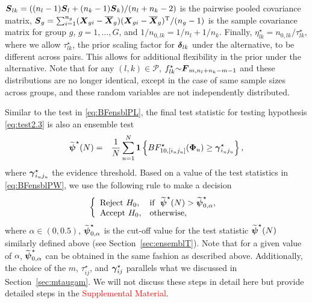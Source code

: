 \documentclass[times,sort&compress,3p]{elsarticle}
\theoremstyle{plain}%
\theoremstyle{definition}
\def\be{\begin{eqnarray}}
\def\ee{\end{eqnarray}}
\def\boldpsi{{\mbox{\boldmath $\psi$}}}
\def\trans{^{\rm T}}
\def\bone{{\mathbf 1}}
\newcommand{\uF}       {\mbox{\boldmath$F$}}
\newcommand{\uS}       {\mbox{\boldmath$S$}}
\newcommand{\uX}       {\mbox{\boldmath$X$}}
\newcommand{\ugamma}            {\mbox{\boldmath$\gamma$}}
\newcommand{\udelta}            {\mbox{\boldmath$\delta$}}
\newcommand{\uPhi}              {\mbox{\boldmath$\Phi$}}
\begin{document}
$\uS_{lk} = ((n_l-1)\uS_{l} + (n_k - 1)\uS_k)/(n_l +n_k -2)$ is the pairwise pooled covariance matrix, $\uS_g = \sum_{i = 1}^{n_g}(\uX_{gi} - \overline{\uX}_g)(\uX_{gi} - \overline{\uX}_g)\trans/(n_g - 1)$ is the sample covariance matrix for group $g$, $g = 1,\ldots,G$, and $1/n_{0,lk} = 1/n_l + 1/n_k$.
Finally, $\eta^{\star}_{lk} = n_{0,lk} /\tau^{\star}_{lk}$, where we allow $\tau^{\star}_{lk}$, the prior scaling factor for $\udelta_{lk}$ under the alternative, to be different across pairs. This allows for additional flexibility in the prior under the alternative.  
Note that for any $ (l,k) \in \mathcal{P}$, $f^{\star}_{lk}{\sim} \uF_{m, n_{l}+n_{k} - m- 1}$ and these distributions are no longer identical, except in the case of same sample sizes across groups, and these random variables are not independently distributed. 

Similar to the test in \eqref{eq:BFensblPL}, the final test statistic for testing hypothesis \eqref{eq:test2.3} is also an ensemble test 
\be
\widetilde{\boldpsi}^{\star}(N) &=& \frac{1}{N}\sum^{N}_{u=1} \bone \left\{ BF^{\star}_{10, [i_u j_u]}(\uPhi_u) \geq \ugamma^{\star}_{i_u j_u} \right\}, \label{eq:BFensblPW}
\ee
where $\ugamma^{\star}_{i_u j_u}$ the evidence threshold. 
Based on a value of the test statistics in \eqref{eq:BFensblPW}, we use the following rule to make a decision
\be
 \left \{
       \begin{array}{llll}
       \mbox{Reject}~ H_{0}, & \mbox{if} ~~ \widetilde{\boldpsi}^{\star}(N) > \widetilde{\boldpsi}^{\star}_{0, \alpha},  \\
       \mbox{Accept}~ H_{0}, & \mbox{otherwise}, \label{eq:ensembleTestPw}
       \end{array}
       \right. \;
\ee
where $\alpha \in (0, 0.5)$, $\widetilde{\boldpsi}^{\star}_{0, \alpha}$ is the cut-off value for the test statistic $\widetilde{\boldpsi}^{\star}(N)$ similarly defined above (see Section~\ref{sec:ensemblT}). Note that for a given value of $\alpha$, $\widetilde{\boldpsi}^{\star}_{0, \alpha}$ can be obtained in the same fashion as described above. Additionally, the choice of the $m$, $\tau^{\star}_{ij}$, and $\ugamma^{\star}_{ij}$ parallels what we discussed in Section~\ref{sec:mtaugam}. We will not discuss these steps in detail here but provide detailed steps in the \textcolor{red}{Supplemental Material}.    
\end{document}
